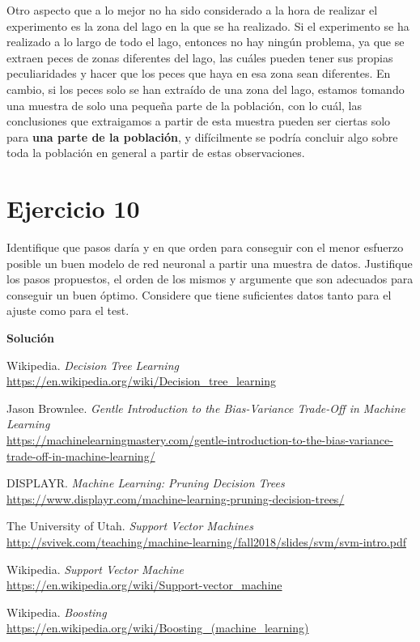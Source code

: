 \documentclass[11pt,a4paper]{article}
\newcommand{\answer}{\noindent\textbf{Solución}}
\newcommand{\addtoc}[1]{\addcontentsline{toc}{section}{#1}}
\begin{document}
Otro aspecto que a lo mejor no ha sido considerado a la hora de realizar el experimento es la zona del lago en la que se ha realizado.
Si el experimento se ha realizado a lo largo de todo el lago, entonces no hay ningún problema, ya que se extraen peces de zonas
diferentes del lago, las cuáles pueden tener sus propias peculiaridades y hacer que los peces que haya en esa zona sean diferentes.
En cambio, si los peces solo se han extraído de una zona del lago, estamos tomando una muestra de solo una pequeña parte de la
población, con lo cuál, las conclusiones que extraigamos a partir de esta muestra pueden ser ciertas solo para \textbf{una parte de
la población}, y difícilmente se podría concluir algo sobre toda la población en general a partir de estas observaciones.


\section*{Ejercicio 10}
\addtoc{Ejercicio 10}

\noindent Identifique que pasos daría y en que orden para conseguir con el menor esfuerzo posible un
buen modelo de red neuronal a partir una muestra de datos. Justifique los pasos propuestos,
el orden de los mismos y argumente que son adecuados para conseguir un buen óptimo.
Considere que tiene suficientes datos tanto para el ajuste como para el test.

\answer

\newpage

\begin{thebibliography}{7}

Wikipedia. \textit{Decision Tree Learning}
\\\url{https://en.wikipedia.org/wiki/Decision_tree_learning}

Jason Brownlee. \textit{Gentle Introduction to the Bias-Variance Trade-Off in Machine Learning}
\\\url{https://machinelearningmastery.com/gentle-introduction-to-the-bias-variance-trade-off-in-machine-learning/}

DISPLAYR. \textit{Machine Learning: Pruning Decision Trees}
\\\url{https://www.displayr.com/machine-learning-pruning-decision-trees/}

The University of Utah. \textit{Support Vector Machines}
\\\url{http://svivek.com/teaching/machine-learning/fall2018/slides/svm/svm-intro.pdf}

Wikipedia. \textit{Support Vector Machine}
\\\url{https://en.wikipedia.org/wiki/Support-vector_machine}

Wikipedia. \textit{Boosting}
\\\url{https://en.wikipedia.org/wiki/Boosting_(machine_learning)}

\end{thebibliography}
\end{document}
